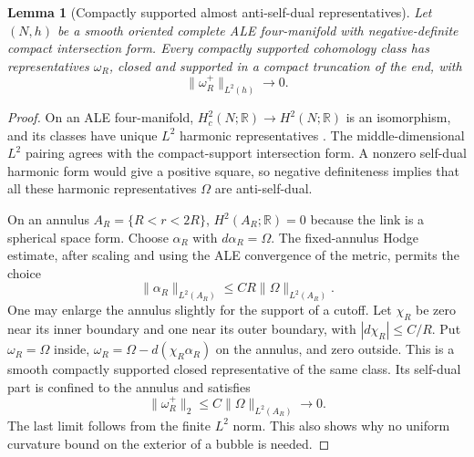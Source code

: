 \documentclass[11pt,a4paper]{article}
\newtheorem{lemma}[theorem]{Lemma}
\theoremstyle{definition}
\theoremstyle{remark}
\begin{document}
\begin{lemma}[Compactly supported almost anti-self-dual representatives]
Let $(N,h)$ be a smooth oriented complete ALE four-manifold with
negative-definite compact intersection form. Every compactly supported
cohomology class has representatives $\omega_R$, closed and supported
in a compact truncation of the end, with
\[
 \|\omega_R^+\|_{L^2(h)}\longrightarrow0.
\]
\end{lemma}
\begin{proof}
On an ALE four-manifold, $H^2_c(N;\mathbb R)\to H^2(N;\mathbb R)$ is an
isomorphism, and its classes have unique $L^2$ harmonic representatives
\cite[Lemma 1.7]{HL}. The middle-dimensional $L^2$ pairing agrees with
the compact-support intersection form. A nonzero self-dual harmonic form
would give a positive square, so negative definiteness implies that all
these harmonic representatives $\Omega$ are anti-self-dual.

On an annulus $A_R=\{R<r<2R\}$, $H^2(A_R;\mathbb R)=0$ because the link
is a spherical space form. Choose $\alpha_R$ with $d\alpha_R=\Omega$.
The fixed-annulus Hodge estimate, after scaling and using the ALE
convergence of the metric, permits the choice
\[
 \|\alpha_R\|_{L^2(A_R)}\le C R\|\Omega\|_{L^2(A_R)}.
\]
One may enlarge the annulus slightly for the support of a cutoff.
Let $\chi_R$ be zero near its inner boundary and one near its outer
boundary, with $|d\chi_R|\le C/R$. Put $\omega_R=\Omega$ inside,
$\omega_R=\Omega-d(\chi_R\alpha_R)$ on the annulus, and zero outside.
This is a smooth compactly supported closed representative of the same
class. Its self-dual part is confined to the annulus and satisfies
\[
 \|\omega_R^+\|_2
 \le C\|\Omega\|_{L^2(A_R)}\longrightarrow0.
\]
The last limit follows from the finite $L^2$ norm. This also shows why
no uniform curvature bound on the exterior of a bubble is needed.
\end{proof}
\end{document}
